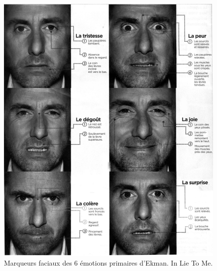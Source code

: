 \begin{figure}
  \centering
  \includegraphics[width=14cm]{./Chapitre1/figures/ExpressionFacial.jpg}
  \caption{Marqueurs faciaux des 6 émotions primaires d'Ekman. In Lie To Me.}
  \label{fig:expressionFacial}
\end{figure}
